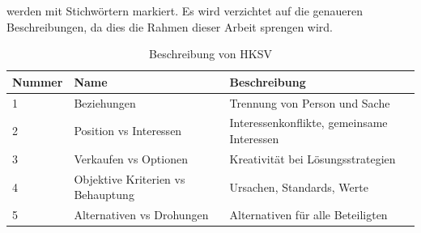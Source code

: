 werden mit Stichwörtern markiert. Es wird verzichtet auf die genaueren Beschreibungen, da dies die Rahmen dieser Arbeit sprengen wird.
\begin{table}[h]
\begin{center}
\begin{tabular}{|l|l|l|}\hline
\textbf{Nummer} & \textbf{Name} & \textbf{Beschreibung} \\
\hline\hline
1 & Beziehungen & Trennung von Person und Sache \\
\hline
2 & Position vs Interessen & Interessenkonflikte, gemeinsame Interessen \\
\hline
3 & Verkaufen vs Optionen & Kreativität bei Lösungsstrategien \\
\hline
4 & Objektive Kriterien vs Behauptung & Ursachen, Standards, Werte \\
\hline
5 & Alternativen vs Drohungen & Alternativen für alle Beteiligten \\
\hline
\end{tabular}
\caption{Beschreibung von HKSV}
\label{tab:beschreibungHKSV}
\end{center}
\end{table}